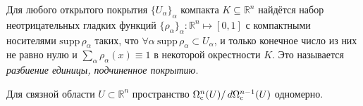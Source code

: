 \begin{to_lem}
\label{lem_6.102}
     Для любого открытого покрытия $\{U_\alpha\}_\alpha$ компакта $K \subseteq \mathbb{R}^n$ найдётся набор неотрицательных гладких функций $\{\rho_\alpha\}_\alpha \colon \mathbb{R}^n \mapsto [0, 1]$ с компактными носителями $\text{supp}\, \rho_\alpha$ таких, что $\forall \alpha \ \text{supp}\, \rho_\alpha \subset U_\alpha$, и только конечное число из них не равно нулю и 
     $\sum_\alpha \rho_\alpha (x) \equiv 1$ в некоторой окрестности $K$. Это называется \emph{разбиение единицы, подчиненное покрытию}.
\end{to_lem}

\begin{to_tas} 
\label{task_6.103}
     Для связной области $U \subset \mathbb{R}^n$ пространство $\Omega_{\text{c}}^n (U) / \, d \Omega_{\text{c}}^{n-1} (U)$ одномерно.
\end{to_tas}
